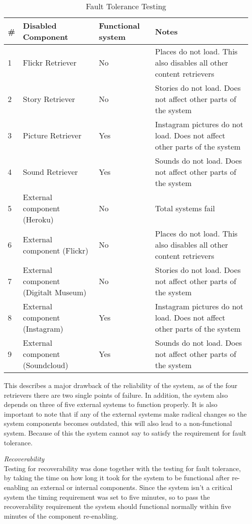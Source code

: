 \begin{table}[!htp]
\begin{center}
	\begin{tabular}{ | l | p{4.2cm} | l | p{6.5cm} | }
	\hline
	\#	&Disabled Component	&Functional system	& Notes \\ \hline
	1	&Flickr Retriever		&No			& Places do not load. This also disables all other content retrievers\\ \hline
	2	&Story Retriever		&No			& Stories do not load. Does not affect other parts of the system\\ \hline
	3	&Picture Retriever	&Yes			& Instagram pictures do not load. Does not affect other parts of the system\\ \hline
	4	&Sound Retriever	&Yes			& Sounds do not load. Does not affect other parts of the system\\ \hline
	5	&External component (Heroku)	&No			& Total systems fail\\ \hline
	6	&External component (Flickr)	&No			& Places do not load. This also disables all other content retrievers\\ \hline
	7	&External component (Digitalt Museum)	&No		& Stories do not load. Does not affect other parts of the system\\ \hline
	8	&External component (Instagram)	&Yes			& Instagram pictures do not load. Does not affect other parts of the system\\ \hline
	9	&External component (Soundcloud)	&Yes			& Sounds do not load. Does not affect other parts of the system\\ 
	 \hline
	 \end{tabular}
\end{center}
\caption{Fault Tolerance Testing}
\label{tab:Fault Tolerance Testing}
\end{table}

This describes a major drawback of the reliability of the system, as of the four retrievers there are two single points of failure. In addition, the system also depends on three of five external systems to function properly. It is also important to note that if any of the external systems make radical changes so the system components becomes outdated, this will also lead to a non-functional system. Because of this the system cannot say to satisfy the requirement for fault tolerance.

\emph{Recoverability}\\

Testing for recoverability was done together with the testing for fault tolerance, by taking the time on how long it took for the system to be functional after re-enabling an external or internal components. Since the system isn't a critical system the timing requirement was set to five minutes, so to pass the recoverability requirement the system should functional normally within five minutes of the component re-enabling. 

